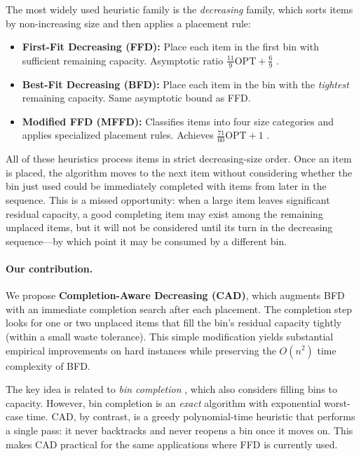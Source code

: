 \documentclass[11pt]{article}
\begin{document}
The most widely used heuristic family is the \emph{decreasing} family, which sorts
items by non-increasing size and then applies a placement rule:
\begin{itemize}[nosep]
  \item \textbf{First-Fit Decreasing (FFD):} Place each item in the first bin with
        sufficient remaining capacity. Asymptotic ratio $\frac{11}{9}\text{OPT} + \frac{6}{9}$
        \citep{dosa2007tight}.
  \item \textbf{Best-Fit Decreasing (BFD):} Place each item in the bin with the
        \emph{tightest} remaining capacity. Same asymptotic bound as FFD.
  \item \textbf{Modified FFD (MFFD):} Classifies items into four size categories and
        applies specialized placement rules. Achieves $\frac{71}{60}\text{OPT} + 1$
        \citep{johnson1985bin}.
\end{itemize}

All of these heuristics process items in strict decreasing-size order. Once an item is
placed, the algorithm moves to the next item without considering whether the bin just
used could be immediately completed with items from later in the sequence. This is
a missed opportunity: when a large item leaves significant residual capacity, a good
completing item may exist among the remaining unplaced items, but it will not be
considered until its turn in the decreasing sequence---by which point it may be
consumed by a different bin.

\paragraph{Our contribution.} We propose \textbf{Completion-Aware Decreasing (CAD)},
which augments BFD with an immediate completion search after each placement. The
completion step looks for one or two unplaced items that fill the bin's residual capacity
tightly (within a small waste tolerance). This simple modification yields substantial
empirical improvements on hard instances while preserving the $O(n^2)$ time complexity
of BFD.

The key idea is related to \emph{bin completion} \citep{korf2002new,fukunaga2007bin},
which also considers filling bins to capacity. However, bin completion is an
\emph{exact} algorithm with exponential worst-case time. CAD, by contrast, is a
greedy polynomial-time heuristic that performs a single pass: it never backtracks and
never reopens a bin once it moves on. This makes CAD practical for the same
applications where FFD is currently used.
\end{document}
